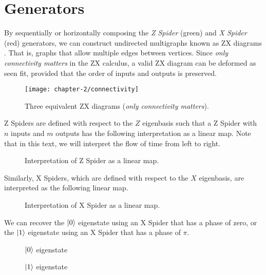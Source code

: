 \section{Generators}

By sequentially or horizontally composing the \textit{Z Spider} (green) and \textit{X Spider} (red) generators, we can construct undirected multigraphs known as ZX diagrams \cite{Wetering2020}. That is, graphs that allow multiple edges between vertices. Since \textit{only connectivity matters} in the ZX calculus, a valid ZX diagram can be deformed as seen fit, provided that the order of inputs and outputs is preserved.

\begin{figure}[H]
\centering
    \centering
    \texttt{[image: chapter-2/connectivity]}
    \caption{Three equivalent ZX diagrams (\textit{only connectivity matters}).}
\end{figure}

Z Spiders are defined with respect to the $Z$ eigenbasis such that a Z Spider with $n$ inputs and $m$ outputs has the following interpretation as a linear map. Note that in this text, we will interpret the flow of time from left to right.

\begin{figure}[H]
\centering
{}
\caption{Interpretation of Z Spider as a linear map.}
\end{figure}

Similarly, X Spiders, which are defined with respect to the $X$ eigenbasis, are interpreted as the following linear map.

\begin{figure}[H]
\centering
{}
\caption{Interpretation of X Spider as a linear map.}
\end{figure}

We can recover the $\ket 0$ eigenstate using an X Spider that has a phase of zero, or the $\ket 1$ eigenstate using an X Spider that has a phase of $\pi$.

\begin{figure}[H]
\centering
\begin{minipage}{.4\textwidth}
    \centering
    \caption{$\ket 0$ eigenstate}
\end{minipage}%
\begin{minipage}{.4\textwidth}
    \centering
    \caption{$\ket 1$ eigenstate}
\end{minipage}
\end{figure}

